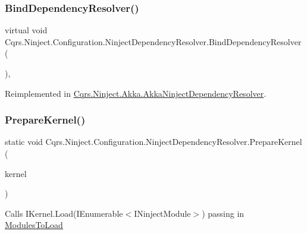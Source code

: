 \subsubsection{\texorpdfstring{Bind\+Dependency\+Resolver()}{BindDependencyResolver()}}
{\footnotesize\ttfamily virtual void Cqrs.\+Ninject.\+Configuration.\+Ninject\+Dependency\+Resolver.\+Bind\+Dependency\+Resolver (\begin{DoxyParamCaption}{ }\end{DoxyParamCaption})\hspace{0.3cm}{\ttfamily [protected]}, {\ttfamily [virtual]}}



Reimplemented in \hyperlink{classCqrs_1_1Ninject_1_1Akka_1_1AkkaNinjectDependencyResolver_ab7ba3c0a331d115073b5118673984507_ab7ba3c0a331d115073b5118673984507}{Cqrs.\+Ninject.\+Akka.\+Akka\+Ninject\+Dependency\+Resolver}.

\mbox{\label{classCqrs_1_1Ninject_1_1Configuration_1_1NinjectDependencyResolver_a00f928f47792a9945513b239a5b82293_a00f928f47792a9945513b239a5b82293}} 
\subsubsection{\texorpdfstring{Prepare\+Kernel()}{PrepareKernel()}}
{\footnotesize\ttfamily static void Cqrs.\+Ninject.\+Configuration.\+Ninject\+Dependency\+Resolver.\+Prepare\+Kernel (\begin{DoxyParamCaption}\item[{I\+Kernel}]{kernel }\end{DoxyParamCaption})\hspace{0.3cm}{\ttfamily [static]}}



Calls I\+Kernel.\+Load(\+I\+Enumerable$<$\+I\+Ninject\+Module$>$) passing in \hyperlink{classCqrs_1_1Ninject_1_1Configuration_1_1NinjectDependencyResolver_a45264a8fae5380727d1af41bc2155381_a45264a8fae5380727d1af41bc2155381}{Modules\+To\+Load} 


